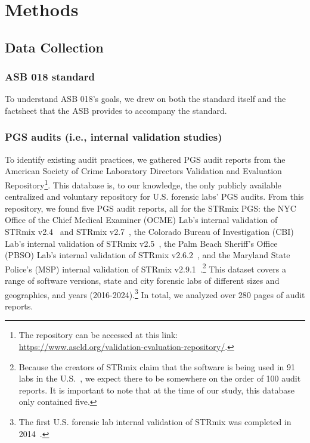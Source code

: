 \section{Methods}
\label{sec:methods}


\subsection{Data Collection}
\label{sec:methods-data-collection}
\subsubsection{ASB 018 standard}
To understand ASB 018's goals, we drew on both the standard itself and the factsheet that the ASB provides to accompany the standard.

\subsubsection{PGS audits (i.e., internal validation studies)}
To identify existing audit practices, we gathered PGS audit reports from the American Society of Crime Laboratory Directors Validation and Evaluation Repository\footnote{The repository can be accessed at this link: \url{https://www.ascld.org/validation-evaluation-repository/}.}. This database is, to our knowledge, the only publicly available centralized and voluntary repository for U.S. forensic labs' PGS audits. From this repository, we found five PGS audit reports, all for the STRmix PGS: the NYC Office of the Chief Medical Examiner (OCME) Lab's internal validation of STRmix v2.4~\cite{ocmeIV} and STRmix v2.7~\cite{ocmeIV2.7}, the Colorado Bureau of Investigation (CBI) Lab's internal validation of STRmix v2.5~\cite{cbiIV}, the Palm Beach Sheriff’s Office (PBSO) Lab's internal validation of STRmix v2.6.2~\cite{pbsoIV}, and the Maryland State Police's (MSP) internal validation of STRmix v2.9.1~\cite{mspIV}.\footnote{Because the creators of STRmix claim that the software is being used in 91 labs in the U.S.~\cite{strmix2025use}, we expect there to be somewhere on the order of 100 audit reports. It is important to note that at the time of our study, this database only contained five.} This dataset covers a range of software versions, state and city forensic labs of different sizes and geographies, and years (2016-2024).\footnote{The first U.S. forensic lab internal validation of STRmix was completed in 2014~\cite{butler2024history}.} In total, we analyzed over 280 pages of audit reports.


